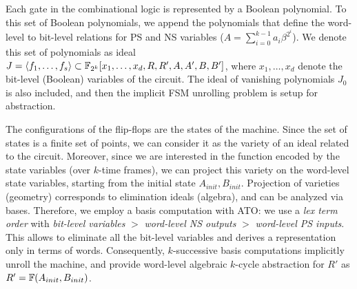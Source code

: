 Each gate in the combinational logic is represented by a Boolean
polynomial. To 
this set of Boolean polynomials, we append the polynomials that define
the word-level to bit-level relations for PS and NS variables ($A =
\sum_{i=0}^{k-1} a_i \beta^{2^i}$). We denote this set of polynomials
as ideal $J = \langle 
f_1, \dots, f_s \rangle \subset {\mathbb{F}}_{2^k}[x_1, \dots, x_d, R, R', A, A', B,
  B']$, where $x_1, \dots, x_d$ denote the bit-level (Boolean) variables
  of the circuit. The ideal of vanishing polynomials $J_0$ is also included, and
then the implicit FSM unrolling problem is setup for abstraction. 

The configurations of the flip-flops are the states of the
machine. Since the set of states is a finite set of points, we
can consider it as the variety of an ideal related to the circuit.
Moreover, since we are interested in
the function encoded by the state variables (over $k$-time
frames), we can project this variety on the word-level state
variables, starting from the initial state $A_{init}, B_{init}$.
Projection of varieties (geometry) corresponds to elimination ideals
(algebra), and can be analyzed via \Grobner bases. Therefore, we
employ a \Grobner basis computation with ATO: we use a {\it lex term
  order} with {\it bit-level variables} 
$>$ {\it word-level NS outputs} $>$ {\it word-level PS inputs}. This
allows to eliminate all the bit-level variables 
and derives a representation only in terms of words. 
Consequently, $k$-successive \Grobner basis computations implicitly
unroll the machine, and provide word-level algebraic $k$-cycle
abstraction for $R'$ as $R' = {\mathbb{F}}(A_{init}, B_{init})$. 

